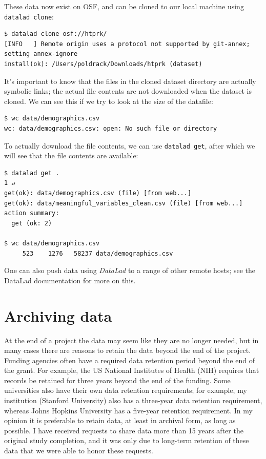 These data now exist on OSF, and can be cloned to our local machine using \texttt{datalad clone}:

\begin{lstlisting}[style=shellshort]
$ datalad clone osf://htprk/
[INFO   ] Remote origin uses a protocol not supported by git-annex; setting annex-ignore
install(ok): /Users/poldrack/Downloads/htprk (dataset)
\end{lstlisting}

It's important to know that the files in the cloned dataset directory are actually symbolic links; the actual file contents are not downloaded when the dataset is cloned. We can see this if we try to look at the size of the datafile:

\begin{lstlisting}[style=shellshort]
$ wc data/demographics.csv
wc: data/demographics.csv: open: No such file or directory
\end{lstlisting}

To actually download the file contents, we can use \texttt{datalad get}, after which we will see that the file contents are available:

\begin{lstlisting}[style=shell]
$ datalad get .                                                          1 ↵
get(ok): data/demographics.csv (file) [from web...]
get(ok): data/meaningful_variables_clean.csv (file) [from web...]
action summary:
  get (ok: 2)

$ wc data/demographics.csv
     523    1276   58237 data/demographics.csv
\end{lstlisting}

One can also push data using \textit{DataLad} to a range of other remote hosts; see the DataLad documentation for more on this.

\section{Archiving data}

At the end of a project the data may seem like they are no longer needed, but in many cases there are reasons to retain the data beyond the end of the project. Funding agencies often have a required data retention period beyond the end of the grant. For example, the US National Institutes of Health (NIH) requires that records be retained for three years beyond the end of the funding.  Some universities also have their own data retention requirements; for example, my institution (Stanford University) also has a three-year data retention requirement, whereas Johns Hopkins University has a five-year retention requirement. In my opinion it is preferable to retain data, at least in archival form, as long as possible. I have received requests to share data more than 15 years after the original study completion, and it was only due to long-term retention of these data that we were able to honor these requests.

